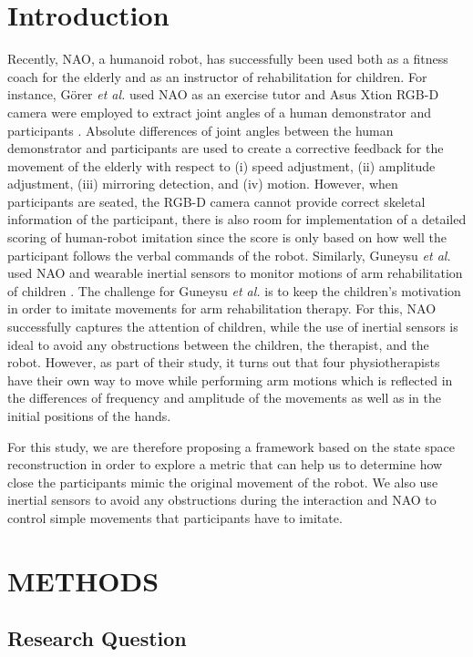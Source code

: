 \documentclass{sig-alternate-05-2015}
\begin{document}
\section{Introduction}
Recently, NAO, a humanoid robot, has successfully been used both as a fitness coach for the elderly 
and as an instructor of rehabilitation for children.
For instance, G{\"{o}}rer \textit{et al.} used NAO as an exercise tutor
and Asus Xtion RGB-D camera were employed to extract joint angles of a human demonstrator and participants \cite{Gorer2016}.
Absolute differences of joint angles between the human demonstrator and participants
are used to create a corrective feedback for the movement of the elderly 
with respect to (i) speed adjustment, (ii) amplitude adjustment, (iii) mirroring detection, and (iv) motion.
However, when participants are seated, the RGB-D camera cannot provide correct skeletal information
of the participant,
there is also room for implementation of a detailed scoring of human-robot imitation
since the score is only based on how well the participant follows the verbal commands of the robot.
Similarly, Guneysu \textit{et al.} used NAO and wearable inertial sensors
to monitor motions of arm rehabilitation of children \cite{Guneysu2015}.
The challenge for Guneysu \textit{et al.} is to keep the children's motivation in order to imitate 
movements for arm rehabilitation therapy. 
For this, NAO successfully captures the attention of children,
while the use of inertial sensors is ideal to avoid any  
obstructions between the children, the therapist, and  the robot.
However, as part of their study, it turns out that four physiotherapists have their own way to move
while performing
arm motions
which is reflected in the differences of frequency and amplitude of the movements
as well as in the initial positions of the hands.

For this study, we are therefore proposing a framework based on the state space reconstruction 
in order to explore a metric that can help us to determine 
how close the participants mimic the original movement of the robot.
We also use inertial sensors to avoid any obstructions during the interaction 
and NAO to control simple movements that participants have to imitate.

\section{METHODS}

\subsection{Research Question}
\end{document}
